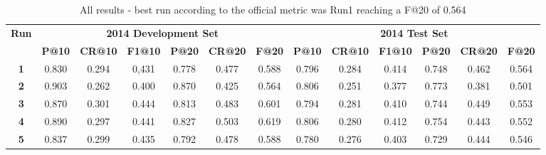 
\begin{table*}[hbt]
\scriptsize
\centering
\begin{tabular}{c|c|c|c|c|c|c|c|c|c|c|c|c}
\toprule 
\multirow{2}{*}{\textbf{Run}} & \multicolumn{6}{c|}{\textbf{2014 Development Set}} & \multicolumn{6}{c}{\textbf{2014 Test Set}}\tabularnewline
\cmidrule{2-13} 
 & \textbf{P@10} & \textbf{CR@10} & \textbf{F1@10} & \textbf{P@20} & \textbf{CR@20} & \textbf{F@20} & \textbf{P@10} & \textbf{CR@10} & \textbf{F1@10} & \textbf{P@20} & \textbf{CR@20} & \textbf{F@20}\tabularnewline
\midrule
\textbf{1} & 0.830 & 0.294 & 0,431 & 0.778 & 0.477 & 0.588 & 0.796 & 0.284  & 0.414  & 0.748  & 0.462  & 0.564\tabularnewline
\textbf{2} & 0.903 & 0.262 & 0.400 & 0.870 & 0.425 & 0.564 & 0.806 & 0.251  & 0.377  & 0.773  & 0.381  & 0.501\tabularnewline
\textbf{3} & 0.870 & 0.301 & 0.444 & 0.813 & 0.483 & 0.601 & 0.794 & 0.281  & 0.410  & 0.744  & 0.449  & 0.553\tabularnewline
\textbf{4} & 0.890 & 0.297 & 0.441 & 0.827 & 0.503 & 0.619 & 0.806 & 0.280 & 0.412 & 0.754  & 0.443 &  0.552\tabularnewline
\textbf{5} & 0.837 & 0.299 & 0.435 & 0.792 & 0.478 & 0.588 & 0.780 & 0.276 & 0.403 & 0.729 & 0.444 &  0.546\tabularnewline
\bottomrule 
\end{tabular}
\caption{All results - best run according to the official metric was Run1 reaching a F@20 of 0.564}
\label{table:results}
\end{table*}


